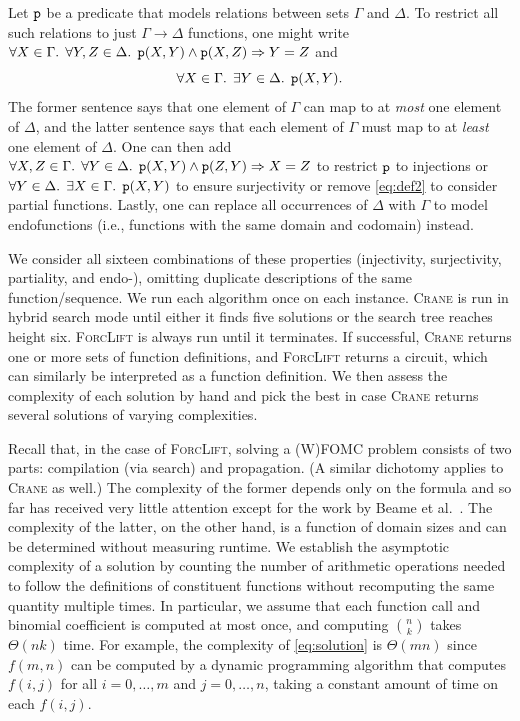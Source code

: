 \documentclass{article}
\newcommand{\predicate}{\texttt{\textup{p}}}
\begin{document}
Let $\predicate$ be a predicate that models relations between sets $\Gamma$ and
$\Delta$. To restrict all such relations to just $\Gamma \to \Delta$ functions,
one might write $\forall X \in \Gamma\text{. }\forall Y,Z \in \Delta\text{.
}\predicate(X, Y) \land \predicate(X, Z) \Rightarrow Y = Z$ and
\begin{equation}\label{eq:def2}
  \forall X \in \Gamma\text{. }\exists Y \in \Delta\text{. }\predicate(X, Y).
\end{equation}
The former sentence says that one element of $\Gamma$ can map to at \emph{most}
one element of $\Delta$, and the latter sentence says that each element of
$\Gamma$ must map to at \emph{least} one element of $\Delta$. One can then add
$\forall X,Z \in \Gamma\text{. }\forall Y \in \Delta\text{.
}\predicate(X, Y) \land \predicate(Z, Y) \Rightarrow X = Z$ to restrict
$\predicate$ to injections or $\forall Y \in \Delta\text{.
}\exists X \in \Gamma\text{. }\predicate(X, Y)$ to ensure surjectivity or remove
\cref{eq:def2} to consider partial functions. Lastly, one can replace all
occurrences of $\Delta$ with $\Gamma$ to model endofunctions (i.e., functions
with the same domain and codomain) instead.

We consider all sixteen combinations of these properties (injectivity,
surjectivity, partiality, and endo-), omitting duplicate descriptions of the
same function/sequence. We run each algorithm once on each instance.
\textsc{Crane} is run in hybrid search mode until either it finds five solutions
or the search tree reaches height six. \textsc{ForcLift} is always run until it
terminates. If successful, \textsc{Crane} returns one or more sets of function
definitions, and \textsc{ForcLift} returns a circuit, which can similarly be
interpreted as a function definition. We then assess the complexity of each
solution by hand and pick the best in case \textsc{Crane} returns several
solutions of varying complexities.


Recall that, in the case of \textsc{ForcLift}, solving a (W)FOMC problem
consists of two parts: compilation (via search) and propagation. (A similar
dichotomy applies to \textsc{Crane} as well.) The complexity of the former
depends only on the formula and so far has received very little attention except
for the work by Beame et al.~. The
complexity of the latter, on the other hand, is a function of domain sizes and
can be determined without measuring runtime. We establish the asymptotic
complexity of a solution by counting the number of arithmetic operations needed
to follow the definitions of constituent functions without recomputing the same
quantity multiple times. In particular, we assume that each function call and
binomial coefficient is computed at most once, and computing $\binom{n}{k}$
takes $\Theta(nk)$ time. For example, the complexity of \cref{eq:solution} is
$\Theta(mn)$ since $f(m, n)$ can be computed by a dynamic programming algorithm
that computes $f(i, j)$ for all $i = 0, \dots, m$ and $j = 0, \dots, n$, taking
a constant amount of time on each $f(i, j)$.
\end{document}
